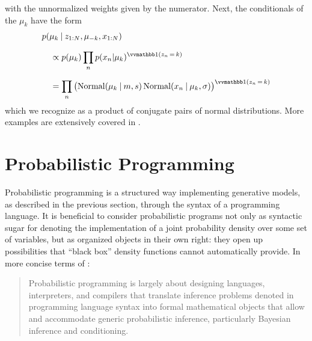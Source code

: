 with the unnormalized weights given by the numerator.  Next, the conditionals of the \(\mu_{k}\)
have the form
\begin{equation}
  \setlength{\jot}{0.8\baselineskip}
  \begin{aligned}
    &p(\mu_{k} \given z_{1:N}, \mu_{-k}, x_{1:N}) \\
    &\quad \propto p(\mu_k) \prod_{n} p(x_{n} | \mu_{k})^{\indicator{z_{n} \, = \, k}} \\
    &\quad = \prod_{n} \left( \Normal(\mu_{k} \given m, s) \,
      \Normal(x_{n} \given \mu_{k}, \sigma) \right)^{\indicator{z_{n} \, = \, k}}
  \end{aligned}
\end{equation}
which we recognize as a product of conjugate pairs of normal distributions.  More examples are
extensively covered in \textcite[chapter 24.2]{murphy2012machine}.

\section{Probabilistic Programming}
\label{sec:prob-prog}

Probabilistic programming is a structured way implementing generative models, as described in the
previous section, through the syntax of a programming language.  It is beneficial to consider
probabilistic programs not only as syntactic sugar for denoting the implementation of a joint
probability density over some set of variables, but as organized objects in their own right: they
open up possibilities that \enquote{black box} density functions cannot automatically provide. In
more concise terms of \textcite{vandemeent2018introduction}:
\begin{quote}
  Probabilistic programming is largely about designing languages, interpreters, and compilers that
  translate inference problems denoted in programming language syntax into formal mathematical
  objects that allow and accommodate generic probabilistic inference, particularly Bayesian
  inference and conditioning.
\end{quote}

